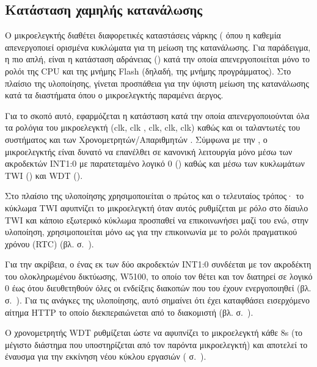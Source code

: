\subsection{Κατάσταση χαμηλής κατανάλωσης}

Ο μικροελεγκτής διαθέτει διαφορετικές καταστάσεις νάρκης (
όπου η καθεμία απενεργοποιεί ορισμένα κυκλώματα για τη μείωση της κατανάλωσης.
Για παράδειγμα, η πιο απλή, είναι η κατάσταση αδράνειας () κατά την
οποία απενεργοποιείται μόνο το ρολόι της CPU και της μνήμης Flash (δηλαδή, της
μνήμης προγράμματος). Στο πλαίσιο της υλοποίησης, γίνεται προσπάθεια για την
ύψιστη μείωση της κατανάλωσης κατά τα διαστήματα όπου ο μικροελεγκτής παραμένει
άεργος.

Για το σκοπό αυτό, εφαρμόζεται η κατάσταση  κατά την οποία
απενεργοποιούνται όλα τα ρολόγια του μικροελεγκτή (clk, clk%
, clk, clk, clk) καθώς και οι
ταλαντωτές του συστήματος και των Χρονομετρητών\slash{}Απαριθμητών \parencite%
[38]{atmel13}. Σύμφωνα με την \textcite[38]{atmel13}, ο μικροελεγκτής είναι
δυνατό να επανέλθει σε κανονική λειτουργία μόνο μέσω των ακροδεκτών INT1:0 με
παρατεταμένο λογικό 0 () καθώς και μέσω των κυκλωμάτων
TWI () και WDT ().

Στο πλαίσιο της υλοποίησης χρησιμοποιείται ο πρώτος και ο τελευταίος τρόπος· το
κύκλωμα TWI αφυπνίζει το μικροελεγκτή όταν αυτός ρυθμίζεται με ρόλο 
στο δίαυλο TWI και κάποιο εξωτερικό κύκλωμα προσπαθεί να επικοινωνήσει μαζί του
ενώ, στην υλοποίηση, χρησιμοποιείται μόνο ως  για την επικοινωνία με
το ρολόι πραγματικού χρόνου (RTC) (βλ.  σ.~\pageref{sec:rtc}).

Για την ακρίβεια, ο ένας εκ των δύο ακροδεκτών INT1:0 συνδέεται με τον ακροδέκτη
 του ολοκληρωμένου δικτύωσης, W5100, το οποίο τον θέτει και τον
διατηρεί σε λογικό 0 έως ότου διευθετηθούν όλες οι ενδείξεις διακοπών που του
έχουν ενεργοποιηθεί
(βλ.  σ.~\pageref{subsec:network:interface}).
Για τις ανάγκες της υλοποίησης, αυτό σημαίνει ότι έχει καταφθάσει εισερχόμενο
αίτημα HTTP το οποίο διεκπεραιώνεται από το διακομιστή (βλ.
 σ.~\pageref{sec:http-server}).

Ο χρονομετρητής WDT ρυθμίζεται ώστε να αφυπνίζει το μικροελεγκτή κάθε 8s (το
μέγιστο διάστημα που υποστηρίζεται από τον παρόντα μικροελεγκτή) και αποτελεί το
έναυσμα για την εκκίνηση νέου κύκλου εργασιών
( σ.~\pageref{ssubsec:task:initiate}).







